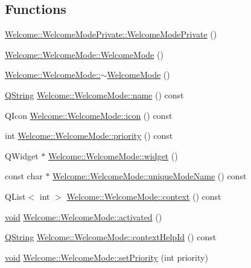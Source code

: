 \subsection*{\-Functions}
\begin{DoxyCompactItemize}
\item 
\hyperlink{group___welcome_plugin_ga75edcc8b045b7553f7bb09bde3a0a491}{\-Welcome\-::\-Welcome\-Mode\-Private\-::\-Welcome\-Mode\-Private} ()
\item 
\hyperlink{group___welcome_plugin_gaddea844272aa36b99c5ebe5e095a70ab}{\-Welcome\-::\-Welcome\-Mode\-::\-Welcome\-Mode} ()
\item 
\hyperlink{group___welcome_plugin_ga5c6c667541394b36ddf50c9ae263f9b2}{\-Welcome\-::\-Welcome\-Mode\-::$\sim$\-Welcome\-Mode} ()
\item 
\hyperlink{group___u_a_v_objects_plugin_gab9d252f49c333c94a72f97ce3105a32d}{\-Q\-String} \hyperlink{group___welcome_plugin_ga7586dbc104467d1a590fa2e0d723ab5c}{\-Welcome\-::\-Welcome\-Mode\-::name} () const 
\item 
\-Q\-Icon \hyperlink{group___welcome_plugin_ga88caad9f6c1d3a4d16f7ee399706cf86}{\-Welcome\-::\-Welcome\-Mode\-::icon} () const 
\item 
int \hyperlink{group___welcome_plugin_gae1d1437fdc5e83102dc1da5cc809834f}{\-Welcome\-::\-Welcome\-Mode\-::priority} () const 
\item 
\-Q\-Widget $\ast$ \hyperlink{group___welcome_plugin_gad367aa736459da2ada111a3944f2a28d}{\-Welcome\-::\-Welcome\-Mode\-::widget} ()
\item 
const char $\ast$ \hyperlink{group___welcome_plugin_gaddd517d76cbff2b9bb0c8e0d672bdcab}{\-Welcome\-::\-Welcome\-Mode\-::unique\-Mode\-Name} () const 
\item 
\-Q\-List$<$ int $>$ \hyperlink{group___welcome_plugin_ga740b152623be8ca1d5f9f22e2b4b5bc4}{\-Welcome\-::\-Welcome\-Mode\-::context} () const 
\item 
\hyperlink{group___u_a_v_objects_plugin_ga444cf2ff3f0ecbe028adce838d373f5c}{void} \hyperlink{group___welcome_plugin_gac79769eb6bfa95dfa1be3459b92e1d60}{\-Welcome\-::\-Welcome\-Mode\-::activated} ()
\item 
\hyperlink{group___u_a_v_objects_plugin_gab9d252f49c333c94a72f97ce3105a32d}{\-Q\-String} \hyperlink{group___welcome_plugin_ga5350ee5cd5a50d966eb0b2522e888183}{\-Welcome\-::\-Welcome\-Mode\-::context\-Help\-Id} () const 
\item 
\hyperlink{group___u_a_v_objects_plugin_ga444cf2ff3f0ecbe028adce838d373f5c}{void} \hyperlink{group___welcome_plugin_ga5e3a43a28b1cf87122fbb4a8872acb69}{\-Welcome\-::\-Welcome\-Mode\-::set\-Priority} (int priority)

\end{DoxyCompactItemize}
